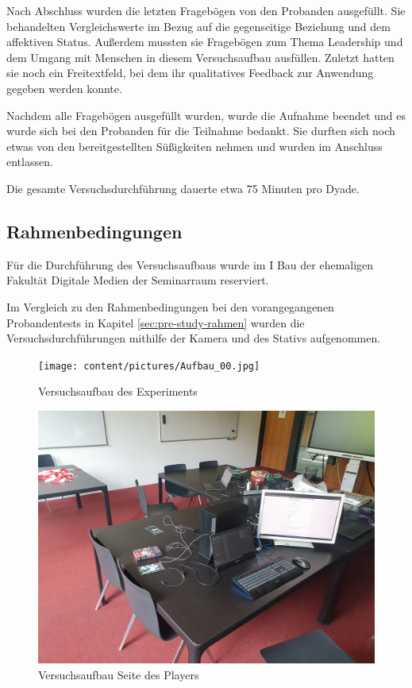 Nach Abschluss wurden die letzten Fragebögen von den Probanden ausgefüllt. Sie behandelten Vergleichswerte im Bezug auf die gegenseitige Beziehung und dem affektiven Status. Außerdem mussten sie Fragebögen zum Thema Leadership und dem Umgang mit Menschen in diesem Versuchsaufbau ausfüllen. Zuletzt hatten sie noch ein Freitextfeld, bei dem ihr qualitatives Feedback zur Anwendung gegeben werden konnte.

Nachdem alle Fragebögen ausgefüllt wurden, wurde die Aufnahme beendet und es wurde sich bei den Probanden für die Teilnahme bedankt. Sie durften sich noch etwas von den bereitgestellten Süßigkeiten nehmen und wurden im Anschluss entlassen.

Die gesamte Versuchsdurchführung dauerte etwa 75 Minuten pro Dyade.

\subsection{Rahmenbedingungen}
Für die Durchführung des Versuchsaufbaus wurde im I Bau der ehemaligen Fakultät Digitale Medien der Seminarraum reserviert. 

Im Vergleich zu den Rahmenbedingungen bei den vorangegangenen Probandentests in Kapitel \ref{sec:pre-study-rahmen} wurden die Versuchsdurchführungen mithilfe der Kamera und des Stativs aufgenommen.

\begin{figure}[ht]
\centering
\texttt{[image: content/pictures/Aufbau\_00.jpg]}
\caption{Versuchsaufbau des Experiments}
\label{fig:study-experiment-00}
\end{figure}

\begin{figure}[ht]
\centering
\includegraphics[width=1\linewidth]{content/pictures/Aufbau_01.jpg}
\caption{Versuchsaufbau Seite des Players}
\label{fig:study-experiment-01}
\end{figure}

